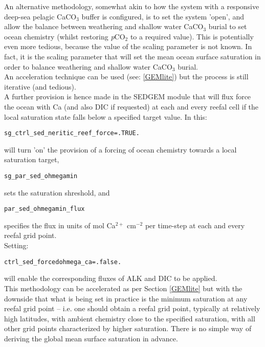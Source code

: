 \documentclass[10pt,twoside]{article}
\begin{document}
\begin{compactenum}
        \item An alternative methodology, somewhat akin to how the system with a responsive deep-sea pelagic CaCO$_{3}$ buffer is configured, is to set the system 'open', and allow the balance between weathering and shallow water CaCO$_{3}$ burial to set ocean chemistry (whilst restoring \textit{p}CO\(_{2}\) to a required value). This is potentially even more tedious, because the value of the scaling parameter is not known. In fact, it is the scaling parameter that will set the mean ocean surface saturation in order to balance weathering and shallow water CaCO$_{3}$ burial.
        \\ An acceleration technique can be used (see: \ref{GEMlite}) but the process is still iterative (and tedious).
        \\ A further provision is hence made in the SEDGEM module that will flux force the ocean with Ca (and also DIC if requested) at each and every reefal cell if the local saturation state falls below a specified target value. In this:
\vspace{-15pt}\begin{verbatim}
sg_ctrl_sed_neritic_reef_force=.TRUE.
\end{verbatim}\vspace{-5pt}
will turn 'on' the provision of a forcing of ocean chemistry towards a local saturation target, 
\vspace{-5pt}\begin{verbatim}
sg_par_sed_ohmegamin
\end{verbatim}\vspace{-5pt}
sets the saturation shreshold, and
\vspace{-5pt}\begin{verbatim}
par_sed_ohmegamin_flux
\end{verbatim}\vspace{-5pt}
specifies the flux in units of mol Ca\(^{2+}\) cm\(^{-2}\) per time-step at each and every reefal grid point.
\\ Setting:
\vspace{-5pt}\begin{verbatim}
ctrl_sed_forcedohmega_ca=.false.
\end{verbatim}\vspace{-5pt}
will enable the corresponding fluxes of ALK and DIC to be applied.
\\ This methodology can be accelerated as per Section \ref{GEMlite} but with the downside that what is being set in practice is the minimum saturation at any reefal grid point -- i.e. one should obtain a reefal grid point, typically at relatively high latitudes, with ambient chemistry close to the specified saturation, with all other grid points characterized by higher saturation. There is no simple way of deriving the global mean surface saturation in advance.

\end{compactenum}
\end{document}
